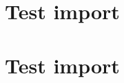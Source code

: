 \chapter{Test import}
\label{autosec:8}
\vspace{-36pt}\hspace{11pt}
\chapter{Test import}
\label{autosec:9}
\vspace{-36pt}\hspace{11pt}

